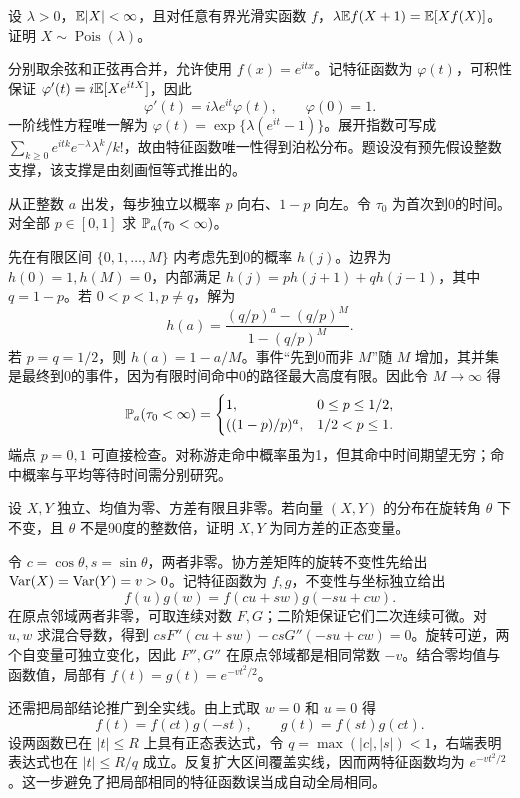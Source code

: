 \begin{example}[原题2：泊松分布的差分恒等式]\label{yau:2020-2}
设 $\lambda>0$，$\mathbb E|X|<\infty$，且对任意有界光滑实函数 $f$，$\lambda\mathbb E f(X+1)=\mathbb E[Xf(X)]$。证明 $X\sim\operatorname{Pois}(\lambda)$。
\end{example}
\begin{solve}
分别取余弦和正弦再合并，允许使用 $f(x)=e^{itx}$。记特征函数为 $\varphi(t)$，可积性保证 $\varphi'(t)=i\mathbb E[Xe^{itX}]$，因此
\[
\varphi'(t)=i\lambda e^{it}\varphi(t),\qquad \varphi(0)=1.
\]
一阶线性方程唯一解为 $\varphi(t)=\exp\{\lambda(e^{it}-1)\}$。展开指数可写成 $\sum_{k\ge0}e^{itk}e^{-\lambda}\lambda^k/k!$，故由特征函数唯一性得到泊松分布。题设没有预先假设整数支撑，该支撑是由刻画恒等式推出的。
\end{solve}

\begin{example}[原题3：偏置随机游走命中零点]\label{yau:2020-3}
从正整数 $a$ 出发，每步独立以概率 $p$ 向右、$1-p$ 向左。令 $\tau_0$ 为首次到0的时间。对全部 $p\in[0,1]$ 求 $\mathbb P_a(\tau_0<\infty)$。
\end{example}
\begin{solve}
先在有限区间 $\{0,1,\ldots,M\}$ 内考虑先到0的概率 $h(j)$。边界为 $h(0)=1,h(M)=0$，内部满足 $h(j)=ph(j+1)+qh(j-1)$，其中 $q=1-p$。若 $0<p<1,p\ne q$，解为
\[
h(a)=\frac{(q/p)^a-(q/p)^M}{1-(q/p)^M}.
\]
若 $p=q=1/2$，则 $h(a)=1-a/M$。事件“先到0而非 $M$”随 $M$ 增加，其并集是最终到0的事件，因为有限时间命中0的路径最大高度有限。因此令 $M\to\infty$ 得
\[
\mathbb P_a(\tau_0<\infty)=\begin{cases}1,&0\le p\le1/2,\\((1-p)/p)^a,&1/2<p\le1.\end{cases}
\]
端点 $p=0,1$ 可直接检查。对称游走命中概率虽为1，但其命中时间期望无穷；命中概率与平均等待时间需分别研究。
\end{solve}

\begin{example}[原题4：独立坐标与旋转不变性的正态刻画]\label{yau:2020-4}
设 $X,Y$ 独立、均值为零、方差有限且非零。若向量 $(X,Y)$ 的分布在旋转角 $\theta$ 下不变，且 $\theta$ 不是90度的整数倍，证明 $X,Y$ 为同方差的正态变量。
\end{example}
\begin{solve}
令 $c=\cos\theta,s=\sin\theta$，两者非零。协方差矩阵的旋转不变性先给出 $\operatorname{Var}(X)=\operatorname{Var}(Y)=v>0$。记特征函数为 $f,g$，不变性与坐标独立给出
\[
f(u)g(w)=f(cu+sw)g(-su+cw).
\]
在原点邻域两者非零，可取连续对数 $F,G$；二阶矩保证它们二次连续可微。对 $u,w$ 求混合导数，得到 $csF''(cu+sw)-csG''(-su+cw)=0$。旋转可逆，两个自变量可独立变化，因此 $F'',G''$ 在原点邻域都是相同常数 $-v$。结合零均值与函数值，局部有 $f(t)=g(t)=e^{-vt^2/2}$。

还需把局部结论推广到全实线。由上式取 $w=0$ 和 $u=0$ 得
\[
f(t)=f(ct)g(-st),\qquad g(t)=f(st)g(ct).
\]
设两函数已在 $|t|\le R$ 上具有正态表达式，令 $q=\max(|c|,|s|)<1$，右端表明表达式也在 $|t|\le R/q$ 成立。反复扩大区间覆盖实线，因而两特征函数均为 $e^{-vt^2/2}$。这一步避免了把局部相同的特征函数误当成自动全局相同。
\end{solve}

